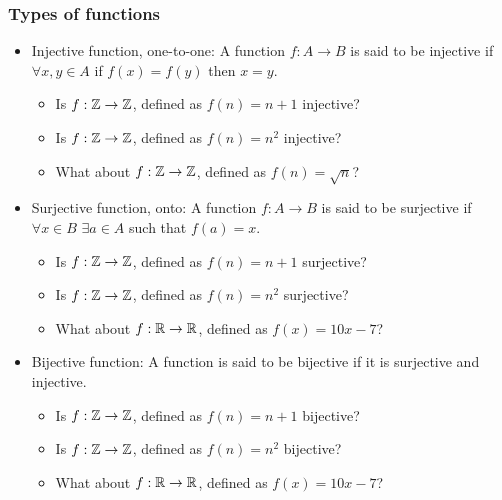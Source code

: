  \begin{frame}[fragile]
\frametitle{Types of functions}
\begin{itemize}
\item Injective function, one-to-one: A function $f: A \rightarrow B$ is said to be injective if $\forall x,y \in A$ if $f(x)=f(y)$ then $x =y$.\\


\begin{itemize}
\item Is $f: {{\mathbb{Z}}} \rightarrow {{\mathbb{Z}}}$, defined as $f(n) = n+1$ injective?

\item Is $f: {{\mathbb{Z}}} \rightarrow {{\mathbb{Z}}}$, defined as $f(n) = n^2$ injective?

\item What about $f: {{\mathbb{Z}}} \rightarrow {{\mathbb{Z}}}$, defined as $f(n) = \sqrt{n}$?

\end{itemize}


\item Surjective function, onto: A function $f: A \rightarrow B$ is said to be surjective if $\forall x\in B$ 
$\exists a \in A$ such that $f(a)=x$. \\


\begin{itemize}
\item Is $f: {{\mathbb{Z}}} \rightarrow {{\mathbb{Z}}}$, defined as $f(n) = n+1$ surjective?

\item Is $f: {{\mathbb{Z}}} \rightarrow {{\mathbb{Z}}}$, defined as $f(n) = n^2$ surjective?

\item What about $f: {{\mathbb{R}}} \rightarrow {{\mathbb{R}}}$, defined as $f(x) = 10x - 7$?

\end{itemize}


\item Bijective function: A function is said to be bijective if it is surjective and injective. \\


\begin{itemize}
\item Is $f: {{\mathbb{Z}}} \rightarrow {{\mathbb{Z}}}$, defined as $f(n) = n+1$ bijective?

\item Is $f: {{\mathbb{Z}}} \rightarrow {{\mathbb{Z}}}$, defined as $f(n) = n^2$ bijective?

\item What about $f: {{\mathbb{R}}} \rightarrow {{\mathbb{R}}}$, defined as $f(x) = 10x - 7$?

\end{itemize}

\end{itemize}
\end{frame}

